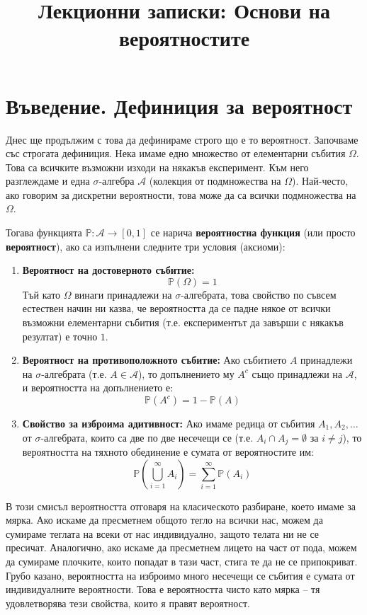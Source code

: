 \documentclass{article}
\begin{document}
\title{Лекционни записки: Основи на вероятностите}
\author{}
\date{}
\maketitle

\section{Въведение. Дефиниция за вероятност}

Днес ще продължим с това да дефинираме строго що е то вероятност. Започваме със строгата дефиниция. Нека имаме едно множество от елементарни събития $\Omega$. Това са всичките възможни изходи на някакъв експеримент. Към него разглеждаме и една $\sigma$-алгебра $\mathcal{A}$ (колекция от подмножества на $\Omega$). Най-често, ако говорим за дискретни вероятности, това може да са всички подмножества на $\Omega$.

Тогава функцията $\mathbb{P}: \mathcal{A} \to [0, 1]$ се нарича \textbf{вероятностна функция} (или просто \textbf{вероятност}), ако са изпълнени следните три условия (аксиоми):

\begin{enumerate}
    \item \textbf{Вероятност на достоверното събитие:} 
    \[ \mathbb{P}(\Omega) = 1 \]
    Тъй като $\Omega$ винаги принадлежи на $\sigma$-алгебрата, това свойство по съвсем естествен начин ни казва, че вероятността да се падне някое от всички възможни елементарни събития (т.е. експериментът да завърши с някакъв резултат) е точно $1$.

    \item \textbf{Вероятност на противоположното събитие:} Ако събитието $A$ принадлежи на $\sigma$-алгебрата (т.е. $A \in \mathcal{A}$), то допълнението му $A^c$ също принадлежи на $\mathcal{A}$, и вероятността на допълнението е:
    \[ \mathbb{P}(A^c) = 1 - \mathbb{P}(A) \]

    \item \textbf{Свойство за изброима адитивност:} Ако имаме редица от събития $A_1, A_2, \dots$ от $\sigma$-алгебрата, които са две по две несечещи се (т.е. $A_i \cap A_j = \emptyset$ за $i \neq j$), то вероятността на тяхното обединение е сумата от вероятностите им:
    \[ \mathbb{P}\left(\bigcup_{i=1}^{\infty} A_i\right) = \sum_{i=1}^{\infty} \mathbb{P}(A_i) \]
\end{enumerate}

В този смисъл вероятността отговаря на класическото разбиране, което имаме за мярка. Ако искаме да пресметнем общото тегло на всички нас, можем да сумираме теглата на всеки от нас индивидуално, защото телата ни не се пресичат. Аналогично, ако искаме да пресметнем лицето на част от пода, можем да сумираме плочките, които попадат в тази част, стига те да не се припокриват. Грубо казано, вероятността на изброимо много несечещи се събития е сумата от индивидуалните вероятности. Това е вероятността чисто като мярка – тя удовлетворява тези свойства, които я правят вероятност.
\end{document}
